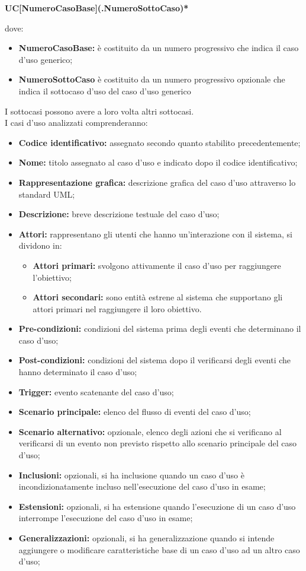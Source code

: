 \begin{center}
	\textbf{UC[NumeroCasoBase](.NumeroSottoCaso)*}
\end{center}
dove:
\begin{itemize}
	\item \textbf{NumeroCasoBase:} è costituito da un numero progressivo che indica il caso d'uso generico;
	\item \textbf{NumeroSottoCaso} è costituito da un numero progressivo opzionale che indica il sottocaso d'uso del caso d'uso generico
\end{itemize}  
I sottocasi possono avere a loro volta altri sottocasi.	\\ 
I casi d'uso analizzati comprenderanno:
\begin{itemize}
	\item \textbf{Codice identificativo: }assegnato secondo quanto stabilito precedentemente;
	\item \textbf{Nome: }titolo assegnato al caso d'uso e indicato dopo il codice identificativo; 
	\item \textbf{Rappresentazione grafica: }descrizione grafica del caso d'uso attraverso lo standard UML;
	\item \textbf{Descrizione: }breve descrizione testuale del caso d'uso;
	\item \textbf{Attori: }rappresentano gli utenti che hanno un'interazione con il sistema, si dividono in:
	\begin{itemize}
		\item \textbf{Attori primari: }svolgono attivamente il caso d'uso per raggiungere l'obiettivo;
		\item \textbf{Attori secondari: }sono entità estrene al sistema che supportano gli attori primari nel raggiungere il loro obiettivo.
	\end{itemize}
	\item \textbf{Pre-condizioni: }condizioni del sistema prima degli eventi che determinano il caso d'uso;
	\item \textbf{Post-condizioni: }condizioni del sistema dopo il verificarsi degli eventi che hanno determinato il caso d'uso;
	\item \textbf{Trigger: }evento scatenante del caso d'uso;
	\item \textbf{Scenario principale: }elenco del flusso di eventi del caso d'uso;
	\item \textbf{Scenario alternativo: }opzionale, elenco degli azioni che si verificano al verificarsi di un evento non previsto rispetto allo scenario principale del caso d'uso;
	\item \textbf{Inclusioni: }opzionali, si ha inclusione quando un caso d'uso è incondizionatamente incluso nell'esecuzione del caso d'uso in esame;	
	\item \textbf{Estensioni: }opzionali, si ha estensione quando l'esecuzione di un caso d'uso interrompe l'esecuzione del caso d'uso in esame;
	\item \textbf{Generalizzazioni: }opzionali, si ha generalizzazione quando si intende aggiungere o modificare caratteristiche base di un caso d'uso ad un altro caso d'uso;
\end{itemize}

